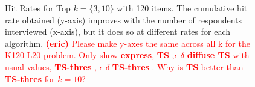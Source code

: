 \documentclass[nonblindrev]{informs3}
\newcommand{\eric}[1]{\textcolor{red}{\textbf{(eric)} #1}}
\newcommand{\fixedexpress}{\textbf{express}}
\newcommand{\ts}{\textbf{TS} }
\newcommand{\edts}{$\epsilon$-$\delta$-\textbf{diffuse TS} }
\newcommand{\tsthres}{\textbf{TS-thres} }
\newcommand{\edtsthres}{$\epsilon$-$\delta$-\textbf{TS-thres} }
\begin{document}
\begin{figure}%
    \caption{Hit Rates for Top $k=\{3,10\}$ with 120 items. The cumulative hit rate obtained (y-axis) improves with the number of respondents interviewed (x-axis), but it does so at different rates for each algorithm. \eric{Please make y-axes the same across all k for the K120 L20 problem. Only show \fixedexpress, \ts,\edts with usual values, \tsthres, \edtsthres. Why is \ts better than \tsthres for $k=10$?   }}%
    \label{fig:K120_L20_k3hit_k10hit}%
 	\begin{center}
    \qquad
	\end{center}
\end{figure}
\end{document}
